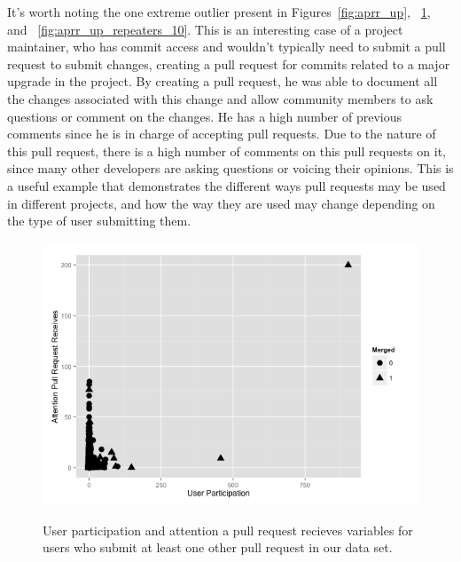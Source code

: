 \documentclass{iitthesis}
\begin{document}
It's worth noting the one extreme outlier present in
Figures~\ref{fig:aprr_up}, ~\ref{fig:aprr_up_repeaters}, and
~\ref{fig:aprr_up_repeaters_10}. This is an interesting case of a project
maintainer, who has commit access and wouldn't typically need to submit a pull
request to submit changes, creating a pull request for commits related to a
major upgrade in the project. By creating a pull request, he was able to
document all the changes associated with this change and allow community members
to ask questions or comment on the changes. He has a high number of previous
comments since he is in charge of accepting pull requests. Due to the nature of
this pull request, there is a high number of comments on this pull requests on
it, since many other developers are asking questions or voicing their opinions.
This is a useful example that demonstrates the different ways pull requests may
be used in different projects, and how the way they are used may change
depending on the type of user submitting them.

\begin{figure}[p] \centering \label{fig:aprr_up_repeaters}
\includegraphics[scale=0.6]{figures/aprr_up_repeaters_ggplot.png} \caption{User
participation and attention a pull request recieves variables for users who
submit at least one other pull request in our data set.} \end{figure}
\end{document}
